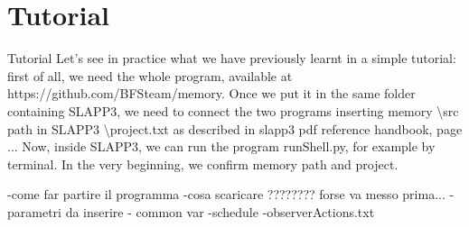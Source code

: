 \section{Tutorial}
Tutorial
Let's see in practice what we  have previously learnt in a simple tutorial: first of all, we need the whole program, available at https://github.com/BFSteam/memory.
Once we put it in the same folder containing SLAPP3, we need to connect the two programs inserting memory \textbackslash src path in  SLAPP3 \textbackslash project.txt as described in  slapp3 pdf reference handbook, page ...
Now, inside SLAPP3, we can run the program runShell.py, for example by terminal.
In the very beginning, we confirm memory path and project.




 




-come far partire il programma
-cosa scaricare ???????? forse va messo prima... 
- parametri da inserire
- common var
-schedule
-observerActions.txt
